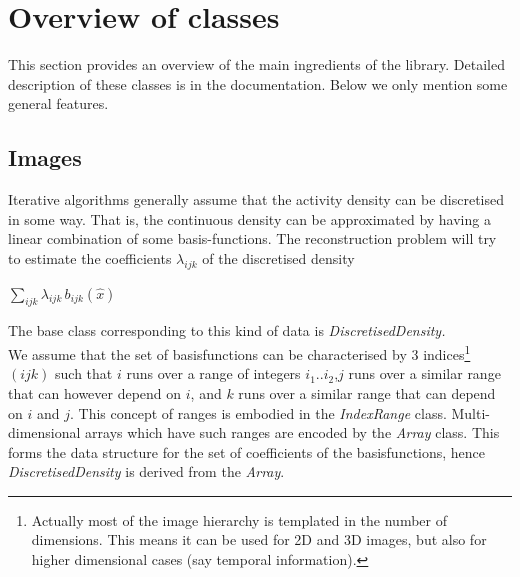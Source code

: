 \documentclass{article}
\begin{document}
\section{
Overview of classes}

This section provides an overview of the main ingredients of 
the library. Detailed description of these classes is in the documentation. 
Below we only mention some general features.



\subsection{
Images}

Iterative algorithms generally assume that the activity density 
can be discretised in some way. That is, the continuous density 
can be approximated by having a linear combination of some basis-functions. 
The reconstruction problem will try to estimate the coefficients $\lambda_{ijk}$ of 
the discretised density


$\sum_{ ijk}\lambda _{ijk} \,b_{ijk} (\widehat{x})  $

The base class corresponding to this kind of data is \textit{DiscretisedDensity.}\\
We assume that the set of basisfunctions can be characterised 
by 3 indices\footnote{{\small Actually most of the image hierarchy is 
templated in the number of dimensions. This means it can be used 
for 2D and 3D images, but also for higher dimensional cases (say 
temporal information).}} $(ijk)$ such that $i$ runs over a 
range of integers $i_1..i_2$,$j$ runs over a 
similar range that can however depend on $i$, and $k$ runs 
over a similar range that can depend on $i$ and $j$. 
This 
concept of ranges is embodied in the \textit{IndexRange} class. Multi-dimensional 
arrays which have such ranges are encoded by the \textit{Array} class. 
This forms the data structure for the set of coefficients of 
the basisfunctions, hence \textit{DiscretisedDensity} is derived from 
the \textit{Array}.
\end{document}
